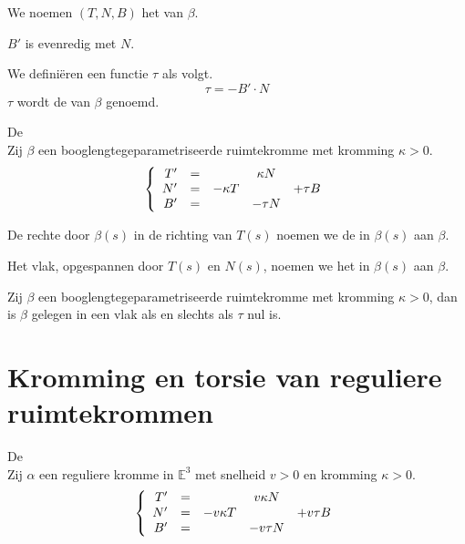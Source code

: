 \documentclass[main.tex]{subfiles}
\begin{document}
\begin{de}
  We noemen $(T,N,B)$ het  van $\beta$.
\end{de}

\begin{lem}
  $B'$ is evenredig met $N$.
\end{lem}
\begin{de}
  We defini\"eren een functie $\tau$ als volgt.
  \[ \tau = -B' \cdot N \]
  $\tau$ wordt de  van $\beta$ genoemd.
\end{de}

\begin{st}
  De \\
  Zij $\beta$ een booglengtegeparametriseerde ruimtekromme met kromming $\kappa>0$.
  \[
  \left\{
    \begin{array}{r cccc}
      T' &=& & \kappa N &\\
      N' &=& -\kappa T & & +\tau B\\
      B' &=& & -\tau N &\\
    \end{array}
  \right.
  \]
\end{st}

\begin{de}
  De rechte door $\beta(s)$ in de richting van $T(s)$ noemen we de  in $\beta(s)$ aan $\beta$.
\end{de}

\begin{de}
  Het vlak, opgespannen door $T(s)$ en $N(s)$, noemen we het  in $\beta(s)$ aan $\beta$.
\end{de}

\begin{st}
  Zij $\beta$ een booglengtegeparametriseerde ruimtekromme met kromming $\kappa> 0$, dan is $\beta$ gelegen in een vlak als en slechts als $\tau$ nul is.
\end{st}

\section{Kromming en torsie van reguliere ruimtekrommen}
\label{sec:kromming-en-torsie}

\begin{st}
  De \\
  Zij $\alpha$ een reguliere kromme in $\mathbb{E}^{3}$ met snelheid $v>0$ en kromming $\kappa > 0$.
  \[
  \left\{
    \begin{array}{r cccc}
      T' &=& & v\kappa N &\\
      N' &=& -v\kappa T & & +v\tau B\\
      B' &=& & -v\tau N &\\
    \end{array}
  \right.
  \]
\end{st}
\end{document}
